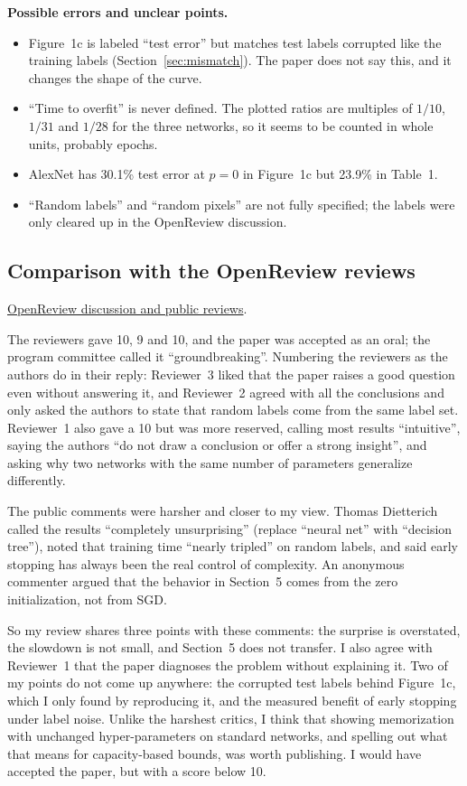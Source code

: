 \textbf{Possible errors and unclear points.}
\begin{itemize}
  \item Figure~1c is labeled ``test error'' but matches test labels corrupted like the training labels (Section~\ref{sec:mismatch}). The paper does not say this, and it changes the shape of the curve.
  \item ``Time to overfit'' is never defined. The plotted ratios are multiples of $1/10$, $1/31$ and $1/28$ for the three networks, so it seems to be counted in whole units, probably epochs.
  \item AlexNet has 30.1\% test error at $p=0$ in Figure~1c but 23.9\% in Table~1.
  \item ``Random labels'' and ``random pixels'' are not fully specified; the labels were only cleared up in the OpenReview discussion.
\end{itemize}

\subsection{Comparison with the OpenReview reviews}
\noindent\href{https://openreview.net/forum?id=Sy8gdB9xx}{OpenReview discussion and public reviews}.

The reviewers gave 10, 9 and 10, and the paper was accepted as an oral; the program committee called it ``groundbreaking''. Numbering the reviewers as the authors do in their reply: Reviewer~3 liked that the paper raises a good question even without answering it, and Reviewer~2 agreed with all the conclusions and only asked the authors to state that random labels come from the same label set. Reviewer~1 also gave a 10 but was more reserved, calling most results ``intuitive'', saying the authors ``do not draw a conclusion or offer a strong insight'', and asking why two networks with the same number of parameters generalize differently.

The public comments were harsher and closer to my view. Thomas Dietterich called the results ``completely unsurprising'' (replace ``neural net'' with ``decision tree''), noted that training time ``nearly tripled'' on random labels, and said early stopping has always been the real control of complexity. An anonymous commenter argued that the behavior in Section~5 comes from the zero initialization, not from SGD.

So my review shares three points with these comments: the surprise is overstated, the slowdown is not small, and Section~5 does not transfer. I also agree with Reviewer~1 that the paper diagnoses the problem without explaining it. Two of my points do not come up anywhere: the corrupted test labels behind Figure~1c, which I only found by reproducing it, and the measured benefit of early stopping under label noise. Unlike the harshest critics, I think that showing memorization with unchanged hyper-parameters on standard networks, and spelling out what that means for capacity-based bounds, was worth publishing. I would have accepted the paper, but with a score below 10.


